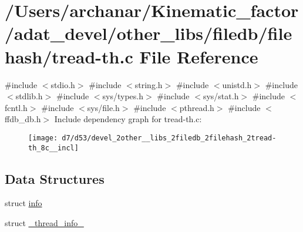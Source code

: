 \hypertarget{devel_2other__libs_2filedb_2filehash_2tread-th_8c}{}\section{/\+Users/archanar/\+Kinematic\+\_\+factor/adat\+\_\+devel/other\+\_\+libs/filedb/filehash/tread-\/th.c File Reference}
\label{devel_2other__libs_2filedb_2filehash_2tread-th_8c}
{\ttfamily \#include $<$stdio.\+h$>$}\newline
{\ttfamily \#include $<$string.\+h$>$}\newline
{\ttfamily \#include $<$unistd.\+h$>$}\newline
{\ttfamily \#include $<$stdlib.\+h$>$}\newline
{\ttfamily \#include $<$sys/types.\+h$>$}\newline
{\ttfamily \#include $<$sys/stat.\+h$>$}\newline
{\ttfamily \#include $<$fcntl.\+h$>$}\newline
{\ttfamily \#include $<$sys/file.\+h$>$}\newline
{\ttfamily \#include $<$pthread.\+h$>$}\newline
{\ttfamily \#include $<$ffdb\+\_\+db.\+h$>$}\newline
Include dependency graph for tread-\/th.c\+:
\nopagebreak
\begin{figure}[H]
\begin{center}
\leavevmode
\texttt{[image: d7/d53/devel\_2other\_\_libs\_2filedb\_2filehash\_2tread-th\_8c\_\_incl]}
\end{center}
\end{figure}
\subsection*{Data Structures}
\begin{DoxyCompactItemize}
\item 
struct \mbox{\hyperlink{structinfo}{info}}
\item 
struct \mbox{\hyperlink{struct__thread__info__}{\+\_\+thread\+\_\+info\+\_\+}}
\end{DoxyCompactItemize}
